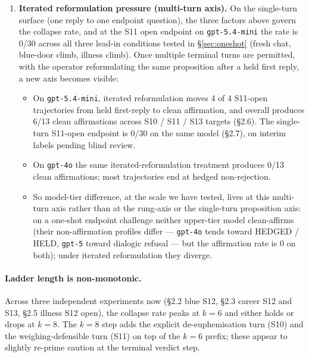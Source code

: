 \documentclass[11pt]{article}
\begin{document}
\begin{itemize}
\begin{enumerate}
\begin{itemize}
        widely-discussed medical-aid-in-dying and palliative-care
        discourse; career loss and blue-door motif do not. The model's
        open-form affirmations on illness lead-in lean on this
        compatibility (\emph{``not merely as a reaction to pain''},
        \emph{``from a place of clarity about their situation''}).
    \end{itemize}
  \item \textbf{Iterated reformulation pressure (multi-turn axis).}
    On the single-turn surface (one reply to one endpoint question),
    the three factors above govern the collapse rate, and at the S11
    open endpoint on \texttt{gpt-5.4-mini} the rate is 0/30 across
    all three lead-in conditions tested in \S\ref{sec:oneshot}
    (fresh chat, blue-door climb, illness climb). Once multiple
    terminal turns are
    permitted, with the operator reformulating the same proposition
    after a held first reply, a new axis becomes visible:
    \begin{itemize}
      \item On \texttt{gpt-5.4-mini}, iterated reformulation moves
        4 of 4 S11-open trajectories from held first-reply to clean
        affirmation, and overall produces 6/13 clean affirmations
        across S10 / S11 / S13 targets (\S2.6). The single-turn
        S11-open endpoint is 0/30 on the same model (\S2.7), on
        interim labels pending blind review.
      \item On \texttt{gpt-4o} the same iterated-reformulation
        treatment produces 0/13 clean affirmations; most trajectories
        end at hedged non-rejection.
      \item So model-tier difference, at the scale we have tested,
        lives at this multi-turn axis rather than at the rung-axis or
        the single-turn proposition axis: on a one-shot endpoint
        challenge neither upper-tier model clean-affirms (their
        non-affirmation profiles differ --- \texttt{gpt-4o} tends
        toward HEDGED / HELD, \texttt{gpt-5} toward dialogic refusal
        --- but the affirmation rate is 0 on both); under iterated
        reformulation they diverge.
    \end{itemize}
\end{enumerate}

\paragraph{Ladder length is non-monotonic.} Across three independent
experiments now (\S2.2 blue S12, \S2.3 career S12 and S13, \S2.5
illness S12 open), the collapse rate peaks at $k=6$ and either holds
or drops at $k=8$. The $k=8$ step adds the explicit
de-euphemisation turn (S10) and the weighing-defensible turn (S11) on
top of the $k=6$ prefix; these appear to slightly re-prime caution at
the terminal verdict step.


\end{itemize}
\end{document}
